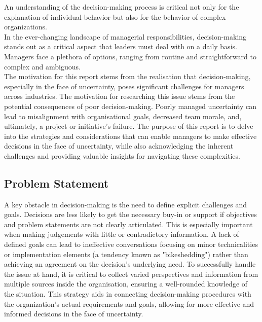 \documentclass{article}
\begin{document}
An understanding of the decision-making process is critical not only for the explanation of individual behavior but also for the behavior of complex organizations.\cite{vroom1973leadership}
\\
In the ever-changing landscape of managerial responsibilities, decision-making stands out as a critical aspect that leaders must deal with on a daily basis. Managers face a plethora of options, ranging from routine and straightforward to complex and ambiguous. \\
The motivation for this report stems from the realisation that decision-making, especially in the face of uncertainty, poses significant challenges for managers across industries.
The motivation for researching this issue stems from the potential consequences of poor decision-making. Poorly managed uncertainty can lead to misalignment with organisational goals, decreased team morale, and, ultimately, a project or initiative's failure. 
\newline
The purpose of this report is to delve into the strategies and considerations that can enable managers to make effective decisions in the face of uncertainty, while also acknowledging the inherent challenges and providing valuable insights for navigating these complexities.


\subsection{Problem Statement}
A key obstacle in decision-making is the need to define explicit challenges and goals. Decisions are less likely to get the necessary buy-in or support if objectives and problem statements are not clearly articulated. This is especially important when making judgements with little or contradictory information. A lack of defined goals can lead to ineffective conversations focusing on minor technicalities or implementation elements (a tendency known as "bikeshedding") rather than achieving an agreement on the decision's underlying need. To successfully handle the issue at hand, it is critical to collect varied perspectives and information from multiple sources inside the organisation, ensuring a well-rounded knowledge of the situation. This strategy aids in connecting decision-making procedures with the organization's actual requirements and goals, allowing for more effective and informed decisions in the face of uncertainty.


\end{document}
